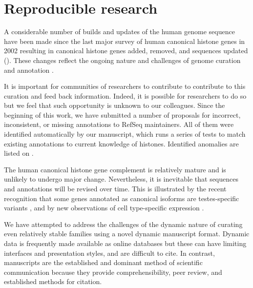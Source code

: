 \section{Reproducible research}
\label{sec:reproducible}

  A considerable number of builds and updates of the human genome sequence have been made
  since the last major survey of human canonical histone genes in 2002 \citep{Marzluff02}
  resulting in
  \AddedSinceReference{} canonical histone genes added,
  \RemovedSinceReference{} removed,
  and
   \result{}
  sequences updated ().
  These changes reflect the ongoing nature and challenges of
  genome curation and annotation \citep{BorkKoonin1998}.

  It is important for communities of researchers to contribute
  to contribute to this curation and feed back information.
  Indeed, it is possible for researchers to do so but we
  feel that such opportunity is unknown to our colleagues.
  Since the beginning of this work, we have submitted a number
  of proposals for incorrect, inconsistent, or missing annotations
  to RefSeq maintainers.  All of them were identified automatically
  by our manuscript, which runs a series of tests to match existing
  annotations to current knowledge of histones.  Identified
  anomalies are listed on .

  The human canonical histone gene complement is relatively mature
  and is unlikely to undergo major change.
  Nevertheless, it is inevitable that sequences and annotations will be revised over time.
  This is illustrated by the recent recognition that
  some genes annotated as canonical isoforms are testes-specific variants \citep{Talbert2012},
  and by new observations of cell type-specific expression \citep{Molden2015}.

  We have attempted to address the challenges of the dynamic nature of curating
  even relatively stable families using a novel dynamic manuscript format.
  Dynamic data is frequently made available as online databases
  but these can have limiting interfaces and presentation styles, and are difficult to cite.
  In contrast, manuscripts are the established and dominant method of scientific communication
  because they provide comprehensibility, peer review, and established methods for citation.

